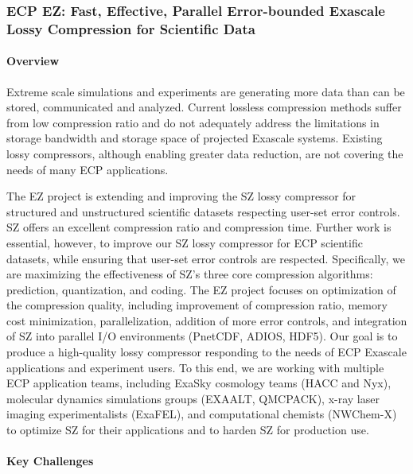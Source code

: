\subsubsection{ECP EZ: Fast, Effective, Parallel Error-bounded Exascale Lossy Compression for Scientific Data}

\paragraph{Overview}

Extreme scale simulations and experiments are generating more data than can be stored, communicated and analyzed. Current lossless compression methods suffer from low compression ratio and do not adequately address the limitations in storage bandwidth and storage space of projected Exascale systems. Existing lossy compressors, although enabling greater data reduction, are not covering the needs of many ECP applications.

The EZ project is extending and improving the SZ lossy compressor for structured and unstructured scientific datasets respecting user-set error controls. SZ offers an excellent compression ratio and compression time. Further work is essential, however, to improve our SZ lossy compressor for ECP scientific datasets, while ensuring that user-set error controls are respected. Specifically, we are maximizing the effectiveness of SZ's three core compression algorithms: prediction, quantization, and coding. The EZ project focuses on optimization of the compression quality, including improvement of compression ratio, memory cost minimization, parallelization, addition of more error controls, and integration of SZ into parallel I/O environments (PnetCDF, ADIOS, HDF5). Our goal is to produce a high-quality lossy compressor responding to the needs of ECP Exascale applications and experiment users. To this end, we are working with multiple ECP application teams, including ExaSky cosmology teams (HACC and Nyx), molecular dynamics simulations groups (EXAALT, QMCPACK), x-ray laser imaging experimentalists (ExaFEL), and computational chemists (NWChem-X) to optimize SZ for their applications and to harden SZ for production use.

\paragraph{Key Challenges}

